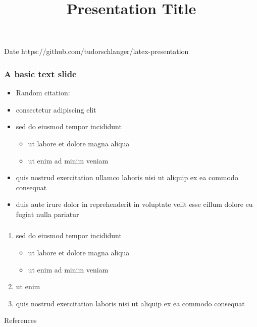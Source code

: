 \documentclass[12pt,xcolor={dvipsnames},hyperref={pdftex,pdfpagemode=UseNone,hidelinks,pdfdisplaydoctitle=true},usepdftitle=false]{beamer}
\newcommand{\bib}{bibliography.bib}
\begin{document}
\title{Presentation Title}
%
{Date}%
{https://github.com/tudorschlanger/latex-presentation}
\frame[plain]{\titlepage}


\begin{frame}
\frametitle{A basic text slide}
    \begin{itemize}
    \item Random citation: \citet{MS21a}
    \item consectetur adipiscing elit
    \item sed do eiusmod tempor incididunt
        \begin{itemize}
        \item ut labore et dolore magna aliqua
        \item ut enim ad minim veniam
        \end{itemize}
    \item quis nostrud exercitation ullamco laboris nisi ut aliquip ex ea commodo consequat
    \item duis aute irure dolor in reprehenderit in voluptate velit esse cillum dolore eu fugiat nulla pariatur
    \end{itemize}
\end{frame}

\begin{frame}
    \frametitle{\citet{LMS18a}}
    \begin{enumerate}
    \item sed do eiusmod tempor incididunt
        \begin{itemize}
        \item ut labore et dolore magna aliqua
        \item ut enim ad minim veniam
        \end{itemize}
    \item ut enim 
    \item quis nostrud exercitation  laboris nisi ut aliquip ex ea commodo consequat
    \end{enumerate}
\end{frame}

\begin{frame}[allowframebreaks]{References}
    
\end{frame}


\lastslide
\end{document}
